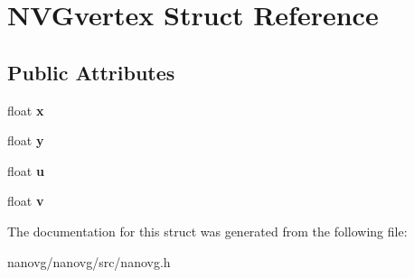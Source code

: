 \hypertarget{struct_n_v_gvertex}{\section{N\+V\+Gvertex Struct Reference}
\label{struct_n_v_gvertex}
}
\subsection*{Public Attributes}
\begin{DoxyCompactItemize}
\item 
\hypertarget{struct_n_v_gvertex_ac0c7b65243540638addff48cfed1b45b}{float {\bfseries x}}\label{struct_n_v_gvertex_ac0c7b65243540638addff48cfed1b45b}

\item 
\hypertarget{struct_n_v_gvertex_a41db7ce4c246f4647ee2fb95005980f0}{float {\bfseries y}}\label{struct_n_v_gvertex_a41db7ce4c246f4647ee2fb95005980f0}

\item 
\hypertarget{struct_n_v_gvertex_a088da6dbeb6388326111df98b74e23e4}{float {\bfseries u}}\label{struct_n_v_gvertex_a088da6dbeb6388326111df98b74e23e4}

\item 
\hypertarget{struct_n_v_gvertex_a545d3a48f8be2f17850542c4214e7489}{float {\bfseries v}}\label{struct_n_v_gvertex_a545d3a48f8be2f17850542c4214e7489}

\end{DoxyCompactItemize}


The documentation for this struct was generated from the following file\+:\begin{DoxyCompactItemize}
\item 
nanovg/nanovg/src/nanovg.\+h\end{DoxyCompactItemize}
